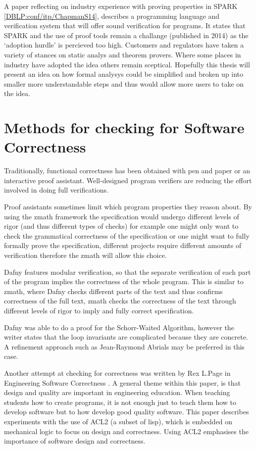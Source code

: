 A paper reflecting on industry experience with proving properties in SPARK \ref{DBLP:conf/itp/ChapmanS14}, describes a programming language and verification system that will offer sound verification for programs. It states that SPARK and the use of proof tools remain a challange (published in 2014) as the `adoption hurdle' is percieved too high. Customers and regulators have taken a variety of stances on static analys and theorem provers. Where some places in industry have adopted the idea others remain sceptical. Hopefully this thesis will present an idea on how formal analysys could be simplified and broken up into smaller more understandable steps and thus would allow more users to take on the idea.

\section{Methods for checking for Software Correctness}

Traditionally, functional correctness has been obtained with pen and paper or an interactive proof assistant. Well-designed program verifiers are reducing the effort involved in doing full verifications.

Proof assistants sometimes limit which program properties they reason about. By using the \gls{zmath} framework the specification would undergo different levels of rigor (and thus different types of checks) for example one might only want to check the grammatical correctness of the specification or one might want to fully formally prove the specification, different projects require different amounts of verification therefore the \gls{zmath} will allow this choice.

Dafny \cite{dafny} features modular verification, so that the separate verification of each part of the program implies the correctness of the whole program. This is similar to \gls{zmath}, where Dafny checks different parts of the text and thus confirms correctness of the full text, \gls{zmath} checks the correctness of the text through different levels of rigor to imply and fully correct specification.

Dafny was able to do a proof for the Schorr-Waited Algorithm, however the writer states that the loop invariants are complicated because they are concrete. A refinement approach such as Jean-Raymond Abrials \cite{abrial} may be preferred in this case.  

Another attempt at checking for correctness was written by Rex L.Page in Engineering Software Correctness \cite{engineeringsoftwarecorrectness}. A general theme within this paper, is that design and quality are important in engineering education. When teaching students how to create programs, it is not enough just to teach them how to develop software but to how develop good quality software. This paper describes experiments with the use of ACL2 (a subset of lisp), which is embedded on mechanical logic to focus on design and correctness. Using ACL2 emphasises the importance of software design and correctness. 

